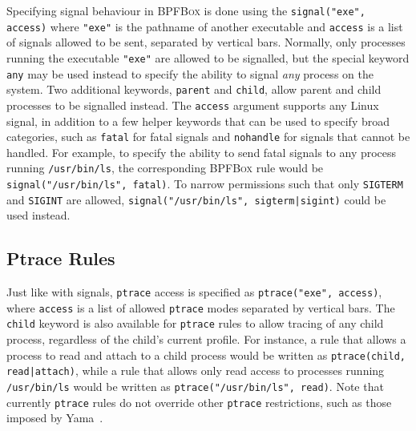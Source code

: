 \documentclass[
  fontsize=12pt,
  titlepage=firstiscover,
  paper=letter,
oneside,
  cleardoublepage=plain,
  parskip=half-,
  DIV=10,
  parindent,
  appendixprefix,
  chapterprefix,
  listof=totoc,
]{scrbook}
\newcommand{\bpfbox}{\textsc{BPFBox}}
\begin{document}
Specifying signal behaviour in \bpfbox{} is done using the
\lstinline[language=bpfbox]{signal("exe", access)} where
\lstinline[language=bpfbox]{"exe"} is the pathname of another executable and
\lstinline[language=bpfbox]{access} is a list of signals allowed to be sent, separated by
vertical bars. Normally, only processes running the executable
\lstinline[language=bpfbox]{"exe"} are allowed to be signalled, but the special keyword
\lstinline[language=bpfbox]{any} may be used instead to specify the ability to signal
\textit{any} process on the system. Two additional keywords,
\lstinline[language=bpfbox]{parent} and \lstinline[language=bpfbox]{child}, allow parent
and child processes to be signalled instead.  The \lstinline[language=bpfbox]{access}
argument supports any Linux signal, in addition to a few helper keywords that can be used
to specify broad categories, such as \lstinline[language=bpfbox]{fatal} for fatal signals
and \lstinline[language=bpfbox]{nohandle} for signals that cannot be handled.  For
example, to specify the ability to send fatal signals to any process running
\texttt{/usr/bin/ls}, the corresponding \bpfbox{} rule would be
\lstinline[language=bpfbox]{signal("/usr/bin/ls", fatal)}.  To narrow permissions such
that only \texttt{SIGTERM} and \texttt{SIGINT} are allowed,
\lstinline[language=bpfbox]{signal("/usr/bin/ls", sigterm|sigint)} could be used instead.



\subsection{Ptrace Rules}\label{ss:bpfbox-ptrace-rules}

Just like with signals, \texttt{ptrace} access is specified as
\lstinline[language=bpfbox]{ptrace("exe", access)}, where
\lstinline[language=bpfbox]{access} is a list of allowed \texttt{ptrace} modes separated
by vertical bars. The \lstinline[language=bpfbox]{child} keyword is also available for
\texttt{ptrace} rules to allow tracing of any child process, regardless of the child's
current profile. For instance, a rule that allows a process to read and attach to a child
process would be written as \lstinline[language=bpfbox]{ptrace(child, read|attach)}, while
a rule that allows only read access to processes running \texttt{/usr/bin/ls} would be
written as \lstinline[language=bpfbox]{ptrace("/usr/bin/ls", read)}.  Note that currently
\texttt{ptrace} rules do not override other \texttt{ptrace} restrictions, such as those
imposed by Yama~\cite{yama}.
\end{document}
